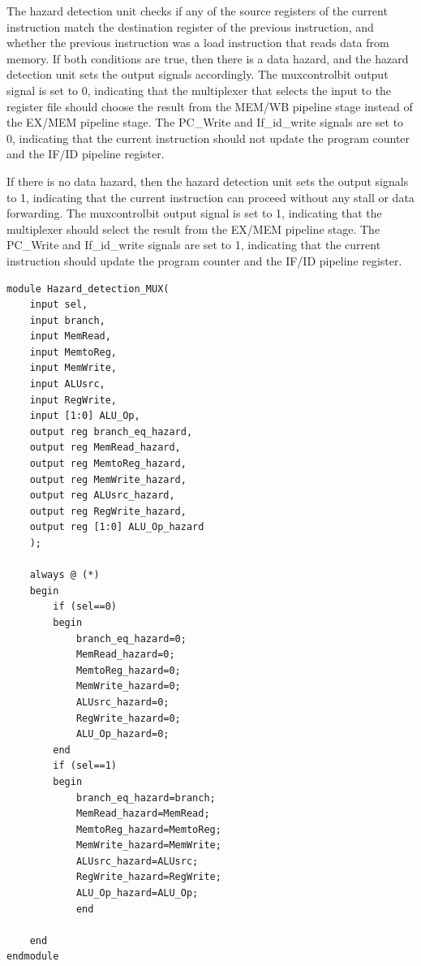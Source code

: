 \documentclass{article}
\begin{document}
The hazard detection unit checks if any of the source registers of the current instruction match the destination register of the previous instruction, and whether the previous instruction was a load instruction that reads data from memory. If both conditions are true, then there is a data hazard, and the hazard detection unit sets the output signals accordingly. The muxcontrolbit output signal is set to 0, indicating that the multiplexer that selects the input to the register file should choose the result from the MEM/WB pipeline stage instead of the EX/MEM pipeline stage. The PC\_Write and If\_id\_write signals are set to 0, indicating that the current instruction should not update the program counter and the IF/ID pipeline register.

If there is no data hazard, then the hazard detection unit sets the output signals to 1, indicating that the current instruction can proceed without any stall or data forwarding. The muxcontrolbit output signal is set to 1, indicating that the multiplexer should select the result from the EX/MEM pipeline stage. The PC\_Write and If\_id\_write signals are set to 1, indicating that the current instruction should update the program counter and the IF/ID pipeline register.

\begin{lstlisting}[caption={Hazard Detection MUX}, captionpos=b, language=RISC-V]
module Hazard_detection_MUX(
    input sel,
    input branch,
    input MemRead,
    input MemtoReg,
    input MemWrite,
    input ALUsrc,
    input RegWrite,
    input [1:0] ALU_Op,
    output reg branch_eq_hazard,
    output reg MemRead_hazard,
    output reg MemtoReg_hazard,
    output reg MemWrite_hazard,
    output reg ALUsrc_hazard,
    output reg RegWrite_hazard,
    output reg [1:0] ALU_Op_hazard
    );

    always @ (*)
    begin
        if (sel==0)
        begin
            branch_eq_hazard=0;
            MemRead_hazard=0;
            MemtoReg_hazard=0;
            MemWrite_hazard=0;
            ALUsrc_hazard=0;
            RegWrite_hazard=0;
            ALU_Op_hazard=0;
        end 
        if (sel==1)
        begin
            branch_eq_hazard=branch;
            MemRead_hazard=MemRead;
            MemtoReg_hazard=MemtoReg;
            MemWrite_hazard=MemWrite;
            ALUsrc_hazard=ALUsrc;
            RegWrite_hazard=RegWrite;
            ALU_Op_hazard=ALU_Op;
            end 
        
    end 
endmodule
\end{lstlisting}
\end{document}
